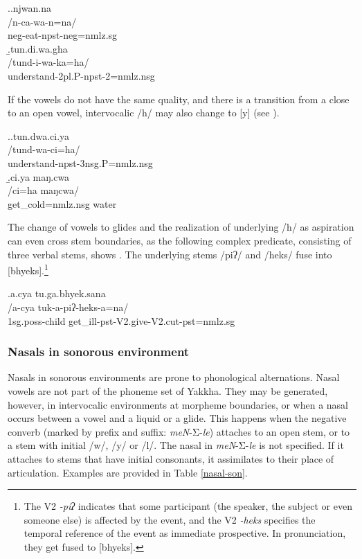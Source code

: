 \ex.\a.\glll njwan.na\\
/n-ca-wa-n=na/\\
{\sc neg-}eat{\sc [3sg.A]-npst-neg=nmlz.sg}\\
\b.\glll  tun.di.wa.gha\\
/tund-i-wa-ka=ha/\\
understand{\sc [3.A]-2pl.P-npst-2=nmlz.nsg}\\

If the vowels do not have the same quality, and there is a transition from a close to an open vowel, intervocalic /h/ may also change to [y]  (see \Next).

\ex.\a.\glll   tun.dwa.ci.ya\\
/tund-wa-ci=ha/\\
understand{\sc [3sg.A]-npst-3nsg.P=nmlz.nsg}\\
\b.\glll   ci.ya maŋ.cwa\\
/ci=ha maŋcwa/\\
get\_cold{\sc =nmlz.nsg} water\\

The change of vowels to glides and the realization of underlying /h/ as aspiration can even cross stem boundaries, as the following complex predicate, consisting of three verbal stems, shows \Next. The underlying stems /piʔ/ and /heks/ fuse into [bhyeks].\footnote{The V2 \emph{-piʔ} indicates that some participant (the speaker, the subject or even someone else) is affected by the event, and the V2 \emph{-heks} specifies the temporal reference of the event as immediate prospective. In pronunciation, they get fused to [bhyeks].} 


\ex.\glll a.cya tu.ga.bhyek.sana\\
/a-cya tuk-a-piʔ-heks-a=na/\\
{\sc 1sg.poss}-child  get\_ill{\sc [3sg]-pst-V2.give-V2.cut-pst=nmlz.sg}\\


\subsubsection{Nasals in sonorous environment}\label{nas-son}

Nasals in sonorous environments are prone to phonological alternations. Nasal vowels are not part of the phoneme set of Yakkha. They may be generated, however, in  intervocalic environments at morpheme boundaries, or when a nasal occurs between a vowel and a liquid or a glide. This happens when the negative converb (marked by prefix and suffix: \emph{meN}-Σ-\emph{le}) attaches to an open stem, or to a stem with initial /w/, /y/ or /l/. The nasal in \emph{meN}-Σ-\emph{le} is not specified. If it attaches to stems that have initial consonants, it assimilates to their place of articulation. Examples are provided in Table \ref{nasal-son}. 

